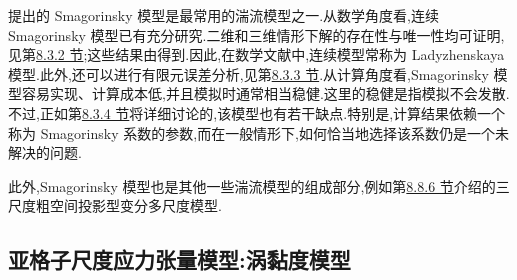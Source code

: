 \begin{note}[本节的动机与内容]
\label{note:smagorinsky-motivation}
\textcite{Smagorinsky1963}提出的 Smagorinsky 模型是最常用的湍流模型之一.从数学角度看,连续 Smagorinsky 模型已有充分研究.二维和三维情形下解的存在性与唯一性均可证明,见第\hyperref[subsec:smagorinsky-existence-uniqueness]{8.3.2 节};这些结果由\textcite{Ladyzhenskaya1967}得到.因此,在数学文献中,连续模型常称为 Ladyzhenskaya 模型.此外,还可以进行有限元误差分析,见第\hyperref[subsec:smagorinsky-error-analysis]{8.3.3 节}.从计算角度看,Smagorinsky 模型容易实现、计算成本低,并且模拟时通常相当稳健.这里的稳健是指模拟不会发散.不过,正如第\hyperref[subsec:smagorinsky-practical-experience]{8.3.4 节}将详细讨论的,该模型也有若干缺点.特别是,计算结果依赖一个称为 Smagorinsky 系数的参数,而在一般情形下,如何恰当地选择该系数仍是一个未解决的问题.

此外,Smagorinsky 模型也是其他一些湍流模型的组成部分,例如第\hyperref[subsec:three-scale-coarse-space-projection-vms]{8.8.6 节}介绍的三尺度粗空间投影型变分多尺度模型.
\end{note}

\subsection{亚格子尺度应力张量模型:涡黏度模型}
\label{subsec:smagorinsky-eddy-viscosity-model}


